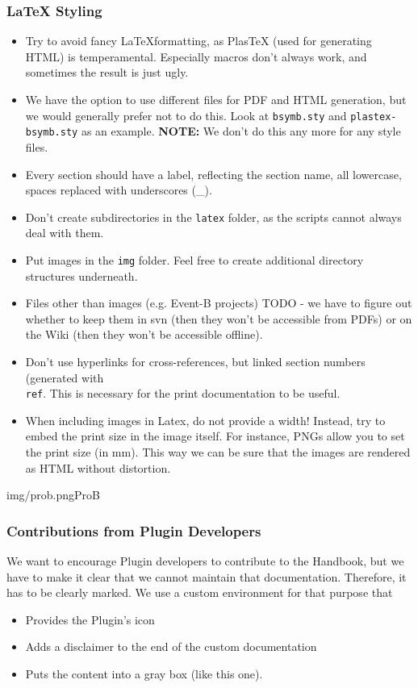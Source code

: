 \subsubsection{\LaTeX{} Styling}

\begin{itemize}
	\item Try to avoid fancy \LaTeX formatting, as PlasTeX (used for generating HTML) is temperamental.  Especially macros don't always work, and sometimes the result is just ugly.
	\item We have the option to use different files for PDF and HTML generation, but we would generally prefer not to do this.  Look at \texttt{bsymb.sty} and \texttt{plastex-bsymb.sty} as an example. \textbf{NOTE:} We don't do this any more for any style files.
	\item Every section should have a label, reflecting the section name, all lowercase, spaces replaced with underscores (\_).
	\item Don't create subdirectories in the \texttt{latex} folder, as the scripts cannot always deal with them.
	\item Put images in the \texttt{img} folder.  Feel free to create additional directory structures underneath.
	\item Files other than images (e.g. Event-B projects) TODO - we have to figure out whether to keep them in svn (then they won't be accessible from PDFs) or on the Wiki (then they won't be accessible offline).
	\item Don't use hyperlinks for cross-references, but linked section numbers (generated with \texttt{\\ref{}}.  This is necessary for the print documentation to be useful.
	\item When including images in Latex, do not provide a width!  Instead, try to embed the print size in the image itself.  For instance, PNGs allow you to set the print size (in mm).  This way we can be sure that the images are rendered as HTML without distortion.
\end{itemize}

\begin{rodin-plugin}{img/prob.png}{ProB}
\subsubsection{Contributions from Plugin Developers}

We want to encourage Plugin developers to contribute to the Handbook, but we have to make it clear that we cannot maintain that documentation.  Therefore, it has to be clearly marked.  We use a custom environment for that purpose that
\begin{itemize}
	\item Provides the Plugin's icon
	\item Adds a disclaimer to the end of the custom documentation
	\item Puts the content into a gray box (like this one).
\end{itemize}

\end{rodin-plugin}



